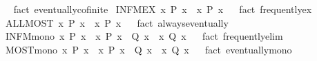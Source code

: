 \begin{isabellebody}
\ %
\endisadelimproof
%
\isatagproof
{}\isamarkupfalse%
\ {\isacharparenleft}fact\ eventually{\isacharunderscore}cofinite{\isacharparenright}%
\endisatagproof
{\isafoldproof}%
%
\isadelimproof
%
\endisadelimproof
\isanewline
{}\isamarkupfalse%
\ INFM{\isacharunderscore}EX{\isacharcolon}\ {\isachardoublequoteopen}{\isacharparenleft}{\isasymexists}\isactrlsub {\isasyminfinity}x{\isachardot}\ P\ x{\isacharparenright}\ {\isasymLongrightarrow}\ {\isacharparenleft}{\isasymexists}x{\isachardot}\ P\ x{\isacharparenright}{\isachardoublequoteclose}%
\isadelimproof
\ %
\endisadelimproof
%
\isatagproof
{}\isamarkupfalse%
\ {\isacharparenleft}fact\ frequently{\isacharunderscore}ex{\isacharparenright}%
\endisatagproof
{\isafoldproof}%
%
\isadelimproof
%
\endisadelimproof
\isanewline
{}\isamarkupfalse%
\ ALL{\isacharunderscore}MOST{\isacharcolon}\ {\isachardoublequoteopen}{\isasymforall}x{\isachardot}\ P\ x\ {\isasymLongrightarrow}\ {\isasymforall}\isactrlsub {\isasyminfinity}x{\isachardot}\ P\ x{\isachardoublequoteclose}%
\isadelimproof
\ %
\endisadelimproof
%
\isatagproof
{}\isamarkupfalse%
\ {\isacharparenleft}fact\ always{\isacharunderscore}eventually{\isacharparenright}%
\endisatagproof
{\isafoldproof}%
%
\isadelimproof
%
\endisadelimproof
\isanewline
{}\isamarkupfalse%
\ INFM{\isacharunderscore}mono{\isacharcolon}\ {\isachardoublequoteopen}{\isasymexists}\isactrlsub {\isasyminfinity}x{\isachardot}\ P\ x\ {\isasymLongrightarrow}\ {\isacharparenleft}{\isasymAnd}x{\isachardot}\ P\ x\ {\isasymLongrightarrow}\ Q\ x{\isacharparenright}\ {\isasymLongrightarrow}\ {\isasymexists}\isactrlsub {\isasyminfinity}x{\isachardot}\ Q\ x{\isachardoublequoteclose}%
\isadelimproof
\ %
\endisadelimproof
%
\isatagproof
{}\isamarkupfalse%
\ {\isacharparenleft}fact\ frequently{\isacharunderscore}elim{}{\isacharparenright}%
\endisatagproof
{\isafoldproof}%
%
\isadelimproof
%
\endisadelimproof
\isanewline
{}\isamarkupfalse%
\ MOST{\isacharunderscore}mono{\isacharcolon}\ {\isachardoublequoteopen}{\isasymforall}\isactrlsub {\isasyminfinity}x{\isachardot}\ P\ x\ {\isasymLongrightarrow}\ {\isacharparenleft}{\isasymAnd}x{\isachardot}\ P\ x\ {\isasymLongrightarrow}\ Q\ x{\isacharparenright}\ {\isasymLongrightarrow}\ {\isasymforall}\isactrlsub {\isasyminfinity}x{\isachardot}\ Q\ x{\isachardoublequoteclose}%
\isadelimproof
\ %
\endisadelimproof
%
\isatagproof
{}\isamarkupfalse%
\ {\isacharparenleft}fact\ eventually{\isacharunderscore}mono{\isacharparenright}%

\end{isabellebody}
